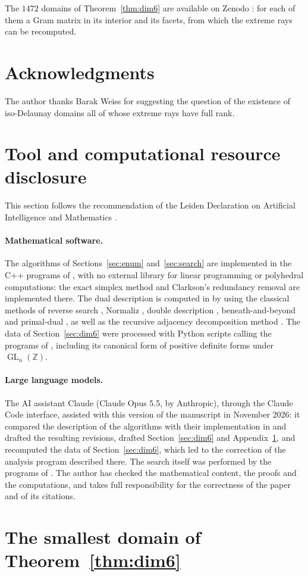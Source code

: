 \documentclass{amsart}
\newcommand{\GL}{\operatorname{GL}}
\newcommand{\ZZ}{\mathbb{Z}}
\begin{document}
The \(1472\) domains of Theorem~\ref{thm:dim6} are available on Zenodo
\cite{DutourSikiricZenodo2026}: for each of them a Gram matrix in its
interior and its facets, from which the extreme rays can be recomputed.

\section*{Acknowledgments}

The author thanks Barak Weiss for suggesting the question of the existence of
iso-Delaunay domains all of whose extreme rays have full rank.

\section*{Tool and computational resource disclosure}

This section follows the recommendation of the Leiden Declaration on
Artificial Intelligence and Mathematics \cite{LeidenDeclaration2026}.

\paragraph{Mathematical software.}
The algorithms of Sections~\ref{sec:enum} and~\ref{sec:search} are implemented in the C++ programs of
\cite{DutourSikiricPolyhedralCommon}, with no external library for linear
programming or polyhedral computations: the exact simplex method and
Clarkson's redundancy removal are implemented there.  The dual description
is computed in \cite{DutourSikiricPolyhedralCommon} by using the classical
methods of reverse search \cite{AvisFukuda1992}, Normaliz
\cite{BrunsIchim2010}, double description
\cite{MotzkinRaiffaThompsonThrall1953}, beneath-and-beyond \cite{Joswig2003}
and primal-dual \cite{BremnerFukudaMarzetta1998}, as well as the recursive
adjacency decomposition method \cite{DutourSikiricBirkhoffF4H4}.
The data of Section~\ref{sec:dim6} were processed with Python scripts calling
the programs of \cite{DutourSikiricPolyhedralCommon}, including its
canonical form of positive definite forms under \(\GL_n(\ZZ)\).

\paragraph{Large language models.}
The AI assistant Claude (Claude Opus 5.5, by Anthropic), through the Claude
Code interface, assisted with this version of the manuscript in November
2026: it compared the description of the algorithms with their implementation
in \cite{DutourSikiricPolyhedralCommon} and drafted the resulting revisions,
drafted Section~\ref{sec:dim6} and Appendix~\ref{app:example}, and
recomputed the data of Section~\ref{sec:dim6}, which led to the correction
of the analysis program described there.  The search itself was performed by
the programs of \cite{DutourSikiricPolyhedralCommon}.
The author has checked the mathematical content, the proofs and the
computations, and takes full responsibility for the correctness of the paper
and of its citations.

\appendix
\section{The smallest domain of Theorem~\ref{thm:dim6}}\label{app:example}





\end{document}
